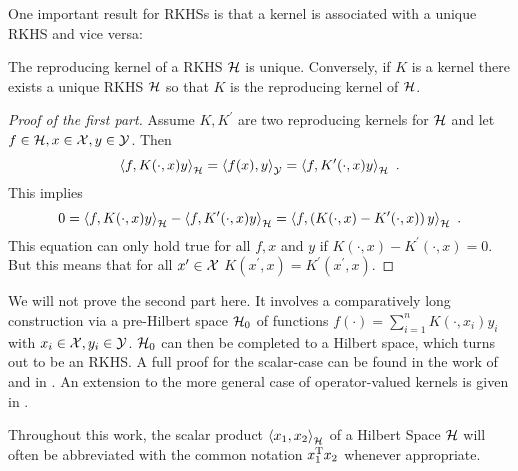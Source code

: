 One important result for RKHSs is that a kernel is associated with a unique RKHS and vice versa:
\begin{theorem}
	\label{theo:kernel-for-rkhs}
	The reproducing kernel of a RKHS $\mathcal{H}$ is unique.
	Conversely, if $K$ is a kernel there exists a unique RKHS $\mathcal{H}$ so that $K$ is the reproducing kernel of $\mathcal{H}$.
\end{theorem}
\begin{proof}[Proof of the first part]
	Assume $K, K^\prime$ are two reproducing kernels for $\mathcal{H}$ and let $f \in \mathcal{H}, x \in \mathcal{X}, y \in \mathcal{Y}$.
	Then
	\begin{equation}
		\left< f, K(\cdot, x)y\right>_{\mathcal{H}} = \left<f(x), y\right>_{\mathcal{Y}} = \left<f, K^\prime(\cdot, x) y\right>_{\mathcal{H}} \ .
	\end{equation}
	This implies
	\begin{equation}
		0 = \left< f, K(\cdot, x)y\right>_{\mathcal{H}} - \left< f, K^\prime(\cdot, x)y\right>_{\mathcal{H}}
		= \left< f, \left(K(\cdot, x) - K^\prime(\cdot, x)\right)y\right>_{\mathcal{H}} \ .
	\end{equation}
	This equation can only hold true for all $f, x$ and $y$ if $K(\cdot, x) - K^\prime(\cdot, x) = 0$.
	But this means that for all $x^\prime \in \mathcal{X}$ $K(x^\prime, x) = K^\prime(x^\prime, x)$.	
\end{proof}

We will not prove the second part here.
It involves a comparatively long construction via a pre-Hilbert space $\mathcal{H}_0$ of functions $f(\cdot) = \sum_{i=1}^n K(\cdot, x_i) y_i$ with $x_i \in \mathcal{X}, y_i \in \mathcal{Y}$.
$\mathcal{H}_0$ can then be completed to a Hilbert space, which turns out to be an RKHS.
A full proof for the scalar-case can be found in the work of \citet{aronszajn50} and in \cite{sejdinovic12, berlinet04}.
An extension to the more general case of operator-valued kernels is given in \cite{kadri16}.

Throughout this work, the scalar product $\left< x_1, x_2 \right>_{\mathcal{H}}$ of a Hilbert Space $\mathcal{H}$ will often be abbreviated with the common notation $x_1^{\mathrm{T}} x_2$ whenever appropriate.